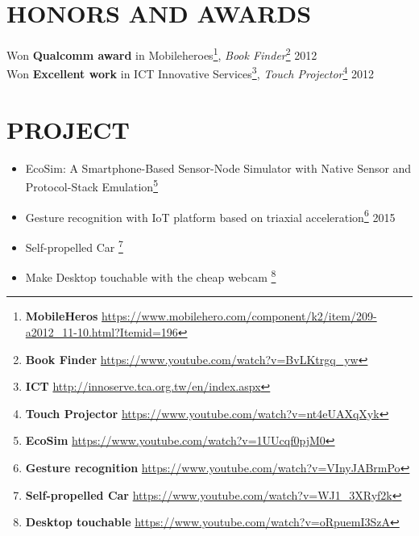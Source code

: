 \documentclass{res}
\begin{document}
\begin{resume}
			\section{HONORS AND AWARDS}          
				Won {\bf Q​ualcomm award} in Mobileheroes\footnote{{\bf MobileHeros}  \url{https://www.mobilehero.com/component/k2/item/209-a2012_11-10.html?Itemid=196}}, {\sl B​ook Finder}\footnote{{\bf Book Finder} \url{https://www.youtube.com/watch?v=BvLKtrgq_yw}   }  \hfill 2012\\
				W​on {\bf Excellent work} in ICT Innovative Services\footnote{{\bf ICT}  \url{http://innoserve.tca.org.tw/en/index.aspx}}, {\sl T​ouch Projector​}\footnote{{\bf Touch Projector}  \url{https://www.youtube.com/watch?v=nt4eUAXqXyk}} \hfill 2012\\  
			\vspace{-0.1in}	
			\section{PROJECT}
			\begin{itemize}
					\item EcoSim: A Smartphone-Based Sensor-Node Simulator with Native Sensor and Protocol-Stack Emulation\footnote{{\bf EcoSim} \url{https://www.youtube.com/watch?v=1UUcqf0pjM0}}
					\vspace{-0.05in}
					\item Gesture recognition with IoT platform based on triaxial acceleration\footnote{{\bf Gesture recognition} \url{https://www.youtube.com/watch?v=VInyJABrmPo}} \hfill2​015
					\vspace{-0.05in}
					\item Self-propelled Car \footnote{{\bf Self-propelled Car} \url{https://www.youtube.com/watch?v=WJ1_3XRyf2k}}
					\vspace{-0.05in}
					\item Make Desktop touchable with the cheap webcam \footnote{{\bf Desktop touchable} \url{https://www.youtube.com/watch?v=oRpuemI3SzA}}
					
			\end{itemize}
				
				

				          
			 
		\end{resume}
	
\end{document}
